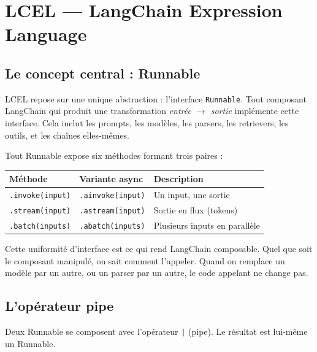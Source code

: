 \documentclass[11pt,a4paper]{article}
\begin{document}
\section{LCEL --- LangChain Expression Language}

\subsection{Le concept central : Runnable}

LCEL repose sur une unique abstraction : l'interface \texttt{Runnable}. Tout composant LangChain qui produit une transformation \emph{entrée $\rightarrow$ sortie} implémente cette interface. Cela inclut les prompts, les modèles, les parsers, les retrievers, les outils, et les chaînes elles-mêmes.

Tout Runnable expose six méthodes formant trois paires :

\begin{center}
\begin{tabular}{lll}
\toprule
\textbf{Méthode} & \textbf{Variante async} & \textbf{Description} \\
\midrule
\texttt{.invoke(input)}   & \texttt{.ainvoke(input)}   & Un input, une sortie \\
\texttt{.stream(input)}   & \texttt{.astream(input)}   & Sortie en flux (tokens) \\
\texttt{.batch(inputs)}   & \texttt{.abatch(inputs)}   & Plusieurs inputs en parallèle \\
\bottomrule
\end{tabular}
\end{center}

\begin{info}
Cette uniformité d'interface est ce qui rend LangChain composable. Quel que soit le composant manipulé, on sait comment l'appeler. Quand on remplace un modèle par un autre, ou un parser par un autre, le code appelant ne change pas.
\end{info}

\subsection{L'opérateur pipe}

Deux Runnable se composent avec l'opérateur \texttt{|} (pipe). Le résultat est lui-même un Runnable.
\end{document}
